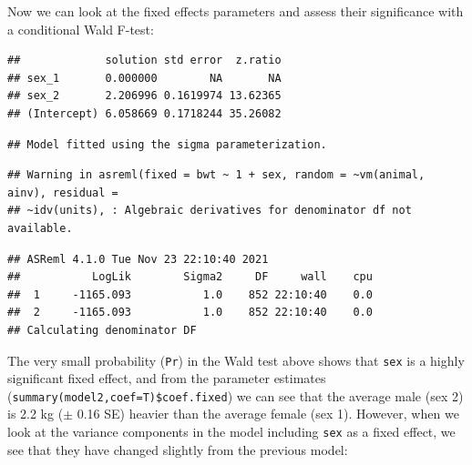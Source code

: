 \documentclass[
  12pt,
]{book}
\newenvironment{Shaded}{\begin{snugshade}}{\end{snugshade}}
\newcommand{\DataTypeTok}[1]{\textcolor[rgb]{0.13,0.29,0.53}{#1}}
\newcommand{\KeywordTok}[1]{\textcolor[rgb]{0.13,0.29,0.53}{\textbf{#1}}}
\newcommand{\NormalTok}[1]{#1}
\newcommand{\OperatorTok}[1]{\textcolor[rgb]{0.81,0.36,0.00}{\textbf{#1}}}
\newcommand{\OtherTok}[1]{\textcolor[rgb]{0.56,0.35,0.01}{#1}}
\newcommand{\StringTok}[1]{\textcolor[rgb]{0.31,0.60,0.02}{#1}}
\begin{document}
Now we can look at the fixed effects parameters and assess their significance with a conditional Wald F-test:

\begin{Shaded}
\end{Shaded}

\begin{verbatim}
##             solution std error  z.ratio
## sex_1       0.000000        NA       NA
## sex_2       2.206996 0.1619974 13.62365
## (Intercept) 6.058669 0.1718244 35.26082
\end{verbatim}

\begin{verbatim}
## Model fitted using the sigma parameterization.
\end{verbatim}

\begin{verbatim}
## Warning in asreml(fixed = bwt ~ 1 + sex, random = ~vm(animal, ainv), residual =
## ~idv(units), : Algebraic derivatives for denominator df not available.
\end{verbatim}

\begin{verbatim}
## ASReml 4.1.0 Tue Nov 23 22:10:40 2021
##           LogLik        Sigma2     DF     wall    cpu
##  1     -1165.093           1.0    852 22:10:40    0.0
##  2     -1165.093           1.0    852 22:10:40    0.0
## Calculating denominator DF
\end{verbatim}

The very small probability (\texttt{Pr}) in the Wald test above shows that \texttt{sex} is a highly significant fixed effect, and from the parameter estimates (\texttt{summary(model2,coef=T)\$coef.fixed}) we can see that the average male (sex 2) is 2.2 kg (\(\pm\) 0.16 SE) heavier than the average female (sex 1). However, when we look at the variance components in the model including \texttt{sex} as a fixed effect, we see that they have changed slightly from the previous model:

\begin{Shaded}
\end{Shaded}
\end{document}
